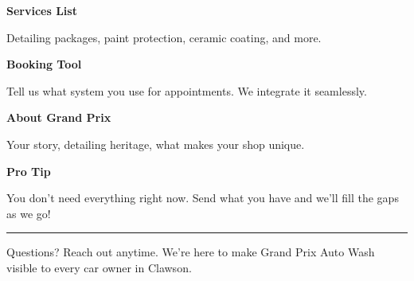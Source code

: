 \documentclass[11pt,letterpaper]{article}
\begin{document}
\begin{minipage}[t]{0.48\textwidth}
\begin{tcolorbox}[colframe=accent-teal, boxrule=1pt, left=0.7em, right=0.7em, top=0.5em, bottom=0.5em, arc=4pt, boxsep=0pt]
{\bfseries\small\color{accent-teal}Services List}

\vspace{0.15em}

{\small Detailing packages, paint protection, ceramic coating, and more.}
\end{tcolorbox}

\vspace{0.1em}

\begin{tcolorbox}[colframe=accent-teal, boxrule=1pt, left=0.7em, right=0.7em, top=0.5em, bottom=0.5em, arc=4pt, boxsep=0pt]
{\bfseries\small\color{accent-teal}Booking Tool}

\vspace{0.15em}

{\small Tell us what system you use for appointments. We integrate it seamlessly.}
\end{tcolorbox}

\vspace{0.1em}

\begin{tcolorbox}[colframe=accent-teal, boxrule=1pt, left=0.7em, right=0.7em, top=0.5em, bottom=0.5em, arc=4pt, boxsep=0pt]
{\bfseries\small\color{accent-teal}About Grand Prix}

\vspace{0.15em}

{\small Your story, detailing heritage, what makes your shop unique.}
\end{tcolorbox}

\vspace{-0.2em}
\end{minipage}

\vspace{0.15em}

\begin{tcolorbox}[colback={accent-red!5}, colframe=accent-red!20, boxrule=0.5pt, left=0.7em, right=0.7em, top=0.4em, bottom=0.4em, arc=6pt, boxsep=0pt]

{\bfseries\small\color{accent-red}Pro Tip}

\vspace{0.1em}

{\small You don't need everything right now. Send what you have and we'll fill the gaps as we go!}

\end{tcolorbox}

\vspace{0.15em}

\noindent\hrule
\vspace{0.2em}

{\small\color{text-light}Questions? Reach out anytime. We're here to make Grand Prix Auto Wash visible to every car owner in Clawson.}
\end{document}
